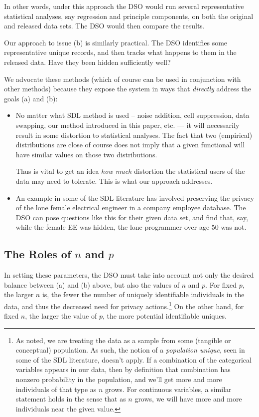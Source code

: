 \documentclass[11pt]{article}
\begin{document}
In other words, under this approach the DSO would run several
representative statistical analyses, say regression and principle
components, on both the original and released data sets.  The DSO would
then compare the results. 

Our approach to issue (b) is similarly practical.  The DSO identifies
some representative unique records, and then tracks what happens to
them in the released data.  Have they been hidden sufficiently well?

We advocate these methods (which of course can be used in conjunction
with other methods) because they expose the system in ways that {\it
directly} address the goals (a) and (b):

\begin{itemize}

\item No matter what SDL method is used -- noise addition, cell
suppression, data swapping, our method introduced in this paper, etc.
--- it will necessarily result in some distortion to statistical analyses.
The fact that two (empirical) distributions are close  of course does
not imply that a given functional will have similar values on those two
distributions.

Thus is vital to get an idea {\it how much} distortion the statistical
users of the data may need to tolerate.  This is what our approach
addresses.

\item An example in some of the SDL literature has involved preserving
the privacy of the lone female electrical engineer in a company
employee database.  The DSO can pose questions like this for their given
data set, and find that, say,  while the female EE was hidden, the lone
programmer over age 50 was not.

\end{itemize}

\subsection{The Roles of $n$ and $p$}

In setting these parameters, the DSO must take into account not only the
desired balance between (a) and (b) above, but also the values of $n$
and $p$.  For fixed $p$, the larger $n$ is, the fewer the number of
uniquely identifiable individuals in the data, and thus the decreased
need for privacy actions.\footnote{As noted, we are treating the data
as a sample from some (tangible or conceptual) population.  As such, the
notion of a {\it population unique}, seen in some of the SDL literature,
doesn't apply.  If a combination of the categorical variables appears in
our data, then by definition that combination has nonzero probability in
the population, and we'll get more and more individuals of that type as
$n$ grows.  For continuous variables, a similar statement holds in the
sense that as $n$ grows, we will have more and more individuals near the
given value.} On the other hand, for fixed $n$, the larger the value of
$p$, the more potential identifiable uniques.
\end{document}
